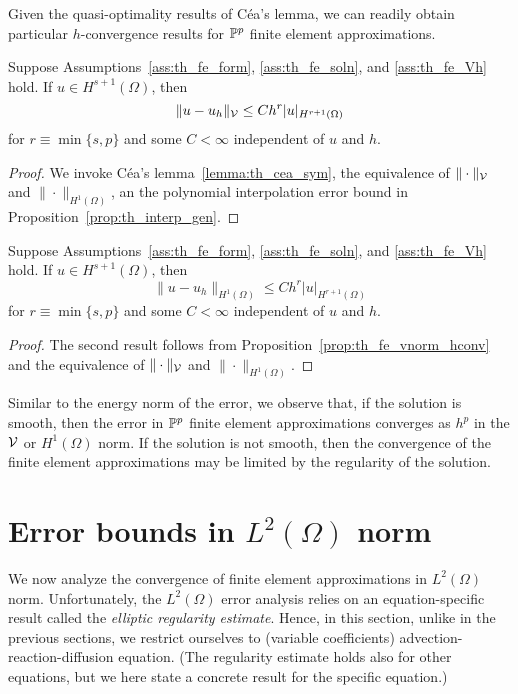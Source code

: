 Given the quasi-optimality results of C\'ea's lemma, we can readily obtain particular $h$-convergence results for $\mathbb{P}^p$ finite element approximations.
\begin{proposition}
  \label{prop:th_fe_vnorm_hconv}
   Suppose Assumptions~\ref{ass:th_fe_form}, \ref{ass:th_fe_soln}, and \ref{ass:th_fe_Vh} hold. If $u \in H^{s+1}(\Omega)$, then
  \begin{equation}
    \| u - u_h \|_{\mathcal{V}} \leq C h^{r} | u |_{H^{r+1}(\Omega)}
  \end{equation}
  for $r \equiv \min\{ s,p \}$ and some $C < \infty$ independent of $u$ and $h$.
  \begin{proof}
    We invoke C\'ea's lemma~\ref{lemma:th_cea_sym}, the equivalence of $\| \cdot \|_{\mathcal{V}}$ and $\| \cdot \|_{H^1(\Omega)}$, an the polynomial interpolation error bound in Proposition~\ref{prop:th_interp_gen}.
  \end{proof}
\end{proposition}
\begin{proposition}
  Suppose Assumptions~\ref{ass:th_fe_form}, \ref{ass:th_fe_soln}, and \ref{ass:th_fe_Vh} hold. If $u \in H^{s+1}(\Omega)$, then
  \begin{equation}
    \| u - u_h \|_{H^1(\Omega)} \leq C h^{r} | u |_{H^{r+1}(\Omega)}
  \end{equation}
  for $r \equiv \min\{ s,p \}$ and some $C < \infty$ independent of $u$ and $h$.
  \begin{proof}
    The second result follows from Proposition~\ref{prop:th_fe_vnorm_hconv} and the equivalence of $\| \cdot \|_{\mathcal{V}}$ and $\| \cdot \|_{H^1(\Omega)}$.
  \end{proof}
\end{proposition}

Similar to the energy norm of the error, we observe that, if the solution is smooth, then the error in $\mathbb{P}^p$ finite element approximations converges as $h^p$ in the $\mathcal{V}$ or $H^1(\Omega)$ norm.  If the solution is not smooth, then the convergence of the finite element approximations may be limited by the regularity of the solution. 


\section{Error bounds in $L^2(\Omega)$ norm}
We now analyze the convergence of finite element approximations in $L^2(\Omega)$ norm.  Unfortunately, the $L^2(\Omega)$ error analysis relies on an equation-specific result called the \emph{elliptic regularity estimate}.  Hence, in this section, unlike in the previous sections, we restrict ourselves to (variable coefficients) advection-reaction-diffusion equation.  (The regularity estimate holds also for other equations, but we here state a concrete result for the specific equation.)

